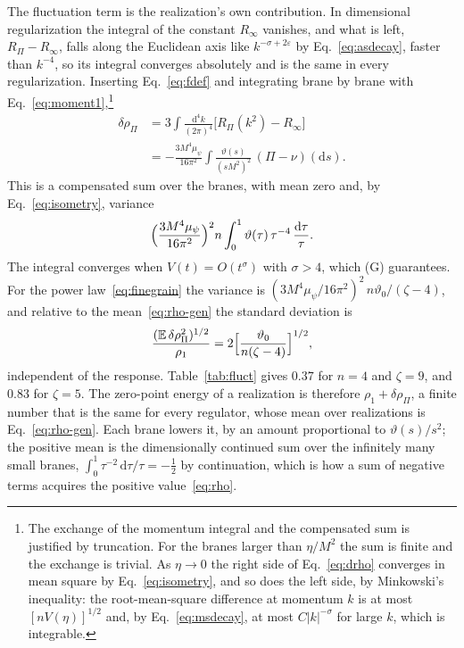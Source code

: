 \documentclass[a4paper,11pt]{article}
\newcommand{\bE}{\mathbb{E}}
\newcommand{\dd}{\mathrm{d}}
\begin{document}
The fluctuation term is the realization's own contribution. In dimensional regularization the integral of the constant $R_\infty$ vanishes, and what is left, $R_\Pi-R_\infty$, falls along the Euclidean axis like $k^{-\sigma+2\varepsilon}$ by Eq.~\eqref{eq:asdecay}, faster than $k^{-4}$, so its integral converges absolutely and is the same in every regularization. Inserting Eq.~\eqref{eq:fdef} and integrating brane by brane with Eq.~\eqref{eq:moment1},\footnote{The exchange of the momentum integral and the compensated sum is justified by truncation. For the branes larger than $\eta/M^2$ the sum is finite and the exchange is trivial. As $\eta\to0$ the right side of Eq.~\eqref{eq:drho} converges in mean square by Eq.~\eqref{eq:isometry}, and so does the left side, by Minkowski's inequality: the root-mean-square difference at momentum $k$ is at most $[nV(\eta)]^{1/2}$ and, by Eq.~\eqref{eq:msdecay}, at most $C|k|^{-\sigma}$ for large $k$, which is integrable.}
\begin{equation}
\label{eq:drho}
\begin{aligned}
\delta\rho_\Pi&=3\int\frac{\dd^4k}{(2\pi)^4}\bigl[R_\Pi(k^2)-R_\infty\bigr]\\
&=-\frac{3M^4\mu_\psi}{16\pi^2}\int\frac{\vartheta(s)}{(sM^2)^2}\,(\Pi-\nu)(\dd s).
\end{aligned}
\end{equation}
This is a compensated sum over the branes, with mean zero and, by Eq.~\eqref{eq:isometry}, variance
\[
\Bigl(\frac{3M^4\mu_\psi}{16\pi^2}\Bigr)^2n\int_0^1\vartheta(\tau)\,\tau^{-4}\,\frac{\dd\tau}{\tau} .
\]
The integral converges when $V(t)=O(t^\sigma)$ with $\sigma>4$, which (G) guarantees. For the power law~\eqref{eq:finegrain} the variance is $(3M^4\mu_\psi/16\pi^2)^2\,n\vartheta_0/(\zeta-4)$, and relative to the mean~\eqref{eq:rho-gen} the standard deviation is
\begin{equation}
\label{eq:drhorel}
\frac{(\bE\,\delta\rho_\Pi^2)^{1/2}}{\rho_1}=2\Bigl[\frac{\vartheta_0}{n(\zeta-4)}\Bigr]^{1/2},
\end{equation}
independent of the response. Table~\ref{tab:fluct} gives $0.37$ for $n=4$ and $\zeta=9$, and $0.83$ for $\zeta=5$. The zero-point energy of a realization is therefore $\rho_1+\delta\rho_\Pi$, a finite number that is the same for every regulator, whose mean over realizations is Eq.~\eqref{eq:rho-gen}. Each brane lowers it, by an amount proportional to $\vartheta(s)/s^2$; the positive mean is the dimensionally continued sum over the infinitely many small branes, $\int_0^1\tau^{-2}\,\dd\tau/\tau=-\frac12$ by continuation, which is how a sum of negative terms acquires the positive value~\eqref{eq:rho}.
\end{document}
